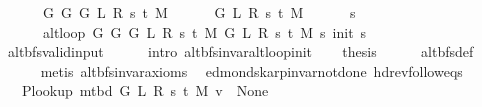 \begin{isabellebody}
\ \ \ \ \ \ {\isacharparenleft}{\kern0pt}G{}\ G\ {\isacharparenleft}{\kern0pt}G{}\ L\ R\ s\ t\ M{\isacharparenright}{\kern0pt}{\isacharparenright}{\kern0pt}\isanewline
\ \ \ \ \ \ {\isacharparenleft}{\kern0pt}G{}\ L\ R\ s\ t\ M{\isacharparenright}{\kern0pt}\isanewline
\ \ \ \ \ \ s\isanewline
\ \ \ \ \ \ {\isacharparenleft}{\kern0pt}alt{\isacharunderscore}{\kern0pt}loop\ {\isacharparenleft}{\kern0pt}G{}\ G\ {\isacharparenleft}{\kern0pt}G{}\ L\ R\ s\ t\ M{\isacharparenright}{\kern0pt}{\isacharparenright}{\kern0pt}\ {\isacharparenleft}{\kern0pt}G{}\ L\ R\ s\ t\ M{\isacharparenright}{\kern0pt}\ s\ {\isacharparenleft}{\kern0pt}init\ s{\isacharparenright}{\kern0pt}{\isacharparenright}{\kern0pt}{\isachardoublequoteclose}\isanewline
\ \ \ \ \isamarkupfalse%
\ alt{\isacharunderscore}{\kern0pt}bfs{\isacharunderscore}{\kern0pt}valid{\isacharunderscore}{\kern0pt}input\isanewline
\ \ \ \ \isamarkupfalse%
\ {\isacharparenleft}{\kern0pt}intro\ alt{\isacharunderscore}{\kern0pt}bfs{\isacharunderscore}{\kern0pt}invar{\isacharunderscore}{\kern0pt}alt{\isacharunderscore}{\kern0pt}loop{\isacharunderscore}{\kern0pt}init{\isacharparenright}{\kern0pt}\isanewline
\ \ \isamarkupfalse%
\ {\isacharquery}{\kern0pt}thesis\isanewline
\ \ \ \ \isamarkupfalse%
\ alt{\isacharunderscore}{\kern0pt}bfs{\isacharunderscore}{\kern0pt}def\isanewline
\ \ \ \ \isamarkupfalse%
\ {\isacharparenleft}{\kern0pt}metis\ alt{\isacharunderscore}{\kern0pt}bfs{\isacharunderscore}{\kern0pt}invar{\isachardot}{\kern0pt}axioms{\isacharparenleft}{\kern0pt}{}{\isacharparenright}{\kern0pt}{\isacharparenright}{\kern0pt}\isanewline
{}\isamarkupfalse%
%
\endisatagproof
{\isafoldproof}%
%
\isadelimproof
\isanewline
%
\endisadelimproof
%
\isadeliminvisible
\isanewline
%
\endisadeliminvisible
%
\isataginvisible
{}\isamarkupfalse%
\ {\isacharparenleft}{\kern0pt}\ edmonds{\isacharunderscore}{\kern0pt}karp{\isacharunderscore}{\kern0pt}invar{\isacharunderscore}{\kern0pt}not{\isacharunderscore}{\kern0pt}done{\isacharunderscore}{\kern0pt}{}{\isacharparenright}{\kern0pt}\ hd{\isacharunderscore}{\kern0pt}rev{\isacharunderscore}{\kern0pt}follow{\isacharunderscore}{\kern0pt}eq{\isacharunderscore}{\kern0pt}s{\isacharcolon}{\kern0pt}\isanewline
\ \ \ {\isachardoublequoteopen}P{\isacharunderscore}{\kern0pt}lookup\ {\isacharparenleft}{\kern0pt}m{\isacharunderscore}{\kern0pt}tbd\ G\ L\ R\ s\ t\ M{\isacharparenright}{\kern0pt}\ v\ {\isasymnoteq}\ None{\isachardoublequoteclose}\isanewline

\end{isabellebody}
